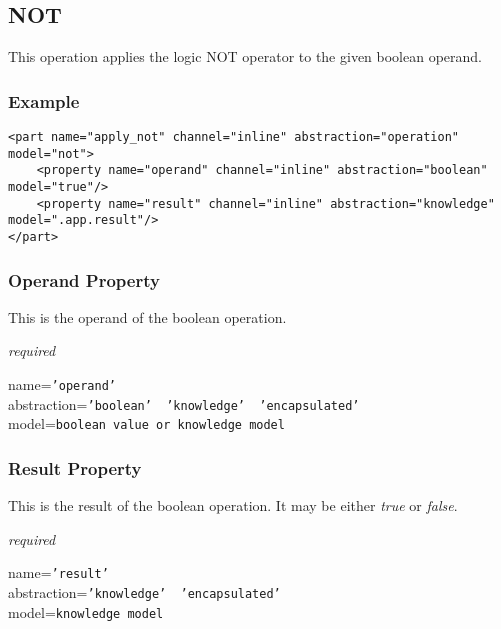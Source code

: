 %
%
%
%
%
%

\subsection{NOT}
\label{not_heading}

This operation applies the logic NOT operator to the given boolean operand.

\subsubsection{Example}

\begin{scriptsize}
    \begin{verbatim}
<part name="apply_not" channel="inline" abstraction="operation" model="not">
    <property name="operand" channel="inline" abstraction="boolean" model="true"/>
    <property name="result" channel="inline" abstraction="knowledge" model=".app.result"/>
</part>
    \end{verbatim}
\end{scriptsize}

\subsubsection{Operand Property}

This is the operand of the boolean operation.

\emph{required}

name=\texttt{'operand'}\\
abstraction=\texttt{'boolean' \vline\ 'knowledge' \vline\ 'encapsulated'}\\
model=\texttt{boolean value or knowledge model}

\subsubsection{Result Property}

This is the result of the boolean operation. It may be either \emph{true} or
\emph{false}.

\emph{required}

name=\texttt{'result'}\\
abstraction=\texttt{'knowledge' \vline\ 'encapsulated'}\\
model=\texttt{knowledge model}
